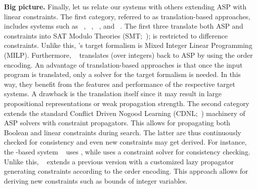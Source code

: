 \textbf{Big picture.}
%
Finally, let us relate our systems with others extending ASP with linear constraints.
%
The first category, referred to as translation-based approaches,
includes systems such as \ezsmt{}~\cite{liesus16a}, \dingo{}~\cite{jalini11a}, \aspmttosmt{}~\cite{barlee14b}, and \mingo{}~\cite{lijani12a}.
The first three translate both ASP and constraints into SAT Modulo Theories (SMT;~\cite{baseseti09a});
\dingo{} is restricted to difference constraints.
Unlike this,
\mingo's target formalism is Mixed Integer Linear Programming (MILP).
Furthermore, \aspartame~\cite{bageinospescsotawe15a} translates  (over integers) back to ASP by using the order encoding.
An advantage of translation-based approaches is that
once the input program is translated,
only a solver for the target formalism is needed.
In this way, they benefit from the features and performance of the respective target systems.
A drawback is the translation itself
since it may result in large propositional representations or weak propagation strength.
%
The second category extends the standard Conflict Driven Nogood Learning (CDNL;~\cite{gekasc09c}) machinery of ASP solvers with constraint propagators.
This allows for propagating both Boolean and linear constraints during search.
The latter are thus continuously checked for consistency and even new constraints may get derived.
For instance, the \clingo-based system \dlvhex[\textsc{cp}]~\cite{roeireri15a} uses \gecode, while \ezcsp{} uses a \prolog{} constraint solver
for consistency checking.
Unlike this,
\inca~\cite{drewal10a} extends a previous \clingo{} version with a customized lazy propagator generating constraints according to the order encoding.
This approach allows for deriving new constraints such as bounds of integer variables.

